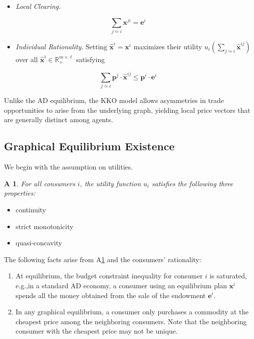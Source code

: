 \documentclass[cm,linguex]{glossa}
\providecommand{\tightlist}{%
  \setlength{\itemsep}{0pt}\setlength{\parskip}{0pt}}
\theoremstyle{defn}
\theoremstyle{axiom}
\newtheorem{axiom}{A\!\!}
\theoremstyle{thm}
\theoremstyle{lem}
\theoremstyle{cor}
\theoremstyle{prop}
\theoremstyle{rmk}
\begin{document}
\begin{itemize}
\tightlist
\item
  \emph{Local Clearing.}
\end{itemize}

\[
\sum_{j \simeq i} \mathbf{x}^{ji} = \mathbf{e}^i
\]

\begin{itemize}
\tightlist
\item
  \emph{Individual Rationality.} Setting
  \(\hat{\mathbf{x}}^i = \mathbf{x}^i\) maximizes their utility
  \(\displaystyle u_i \left( \sum_{j \simeq i} \hat{\mathbf{x}}^{ij} \right)\)
  over all \(\hat{\mathbf{x}}^i \in \mathbb{R}^{m \times \ell}_+\)
  satisfying
\end{itemize}

\[
\sum_{j \simeq i} \mathbf{p}^j \cdot \hat{\mathbf{x}}^{ij} \leq \mathbf{p}^i \cdot \mathbf{e}^i
\]

Unlike the AD equilibrium, the KKO model allows asymmetries in trade
opportunities to arise from the underlying graph, yielding local price
vectors that are generally distinct among agents.

\hypertarget{graphical-equilibrium-existence}{%
\subsection{Graphical Equilibrium
Existence}\label{graphical-equilibrium-existence}}

We begin with the assumption on utilities.

\begin{axiom}
\label{A1}
For all consumers $i$, the utility function $u_i$ satisfies the following three properties:
\end{axiom}

\begin{itemize}
\tightlist
\item
  continuity
\item
  strict monotonicity
\item
  quasi-concavity
\end{itemize}

The following facts arise from A\ref{A1} and the consumers' rationality:

\begin{enumerate}
\def\labelenumi{\arabic{enumi}.}
\tightlist
\item
  At equilibrium, the budget constraint inequality for consumer \(i\) is
  saturated, e.g.,in a standard AD economy, a consumer using an
  equilibrium plan \(\mathbf{x}^i\) spends all the money obtained from
  the sale of the endowment \(\mathbf{e}^i\).
\item
  In any graphical equilibrium, a consumer only purchases a commodity at
  the cheapest price among the neighboring consumers. Note that the
  neighboring consumer with the cheapest price may not be unique.
\end{enumerate}
\end{document}
